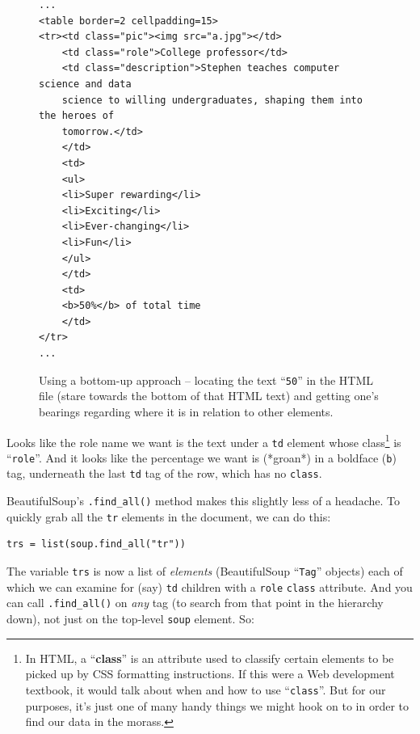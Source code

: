 \begin{figure}[ht]
\centering
\begin{Verbatim}[fontsize=\footnotesize,samepage=true,frame=lines]
...
<table border=2 cellpadding=15>
<tr><td class="pic"><img src="a.jpg"></td>
    <td class="role">College professor</td>
    <td class="description">Stephen teaches computer science and data
    science to willing undergraduates, shaping them into the heroes of
    tomorrow.</td>
    </td>
    <td>
    <ul>
    <li>Super rewarding</li>
    <li>Exciting</li>
    <li>Ever-changing</li>
    <li>Fun</li>
    </ul>
    </td>
    <td>
    <b>50%</b> of total time
    </td>
</tr>
...
\end{Verbatim}
\caption{Using a bottom-up approach -- locating the text ``\texttt{50}'' in the
HTML file (stare towards the bottom of that HTML text) and getting one's
bearings regarding where it is in relation to other elements.}
\label{fig:bottomUpSearch}
\end{figure}
\normalsize


Looks like the role name we want is the text under a \texttt{td} element whose
class\footnote{In HTML, a ``\textbf{class}'' is an attribute used to classify
certain elements to be picked up by CSS formatting instructions. If this were a
Web development textbook, it would talk about when and how to use
``\texttt{class}''. But for our purposes, it's just one of many handy things we
might hook on to in order to find our data in the morass.} is
``\texttt{role}''. And it looks like the percentage we want is (*groan*) in a
boldface (\texttt{b}) tag, underneath the last \texttt{td} tag of the row,
which has no \texttt{class}.


BeautifulSoup's \texttt{.find\_all()} method makes this slightly less of a
headache. To quickly grab all the \texttt{tr} elements in the document, we can
do this:

\begin{Verbatim}[fontsize=\small,samepage=true,frame=single,framesep=3mm]
trs = list(soup.find_all("tr"))
\end{Verbatim}


The variable \texttt{trs} is now a list of \textit{elements} (BeautifulSoup
``\texttt{Tag}'' objects) each of which we can examine for (say) \texttt{td}
children with a \texttt{role} \texttt{class} attribute. And you can call
\texttt{.find\_all()} on \textit{any} tag (to search from that point in the
hierarchy down), not just on the top-level \texttt{soup} element. So:

